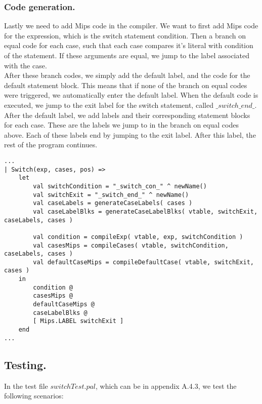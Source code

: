 \documentclass[12pt]{article}
\begin{document}
\pagebreak

\subsubsection{Code generation.}

\noindent Lastly we need to add Mips code in the compiler. We want to first add Mips code for the expression, which is the switch statement condition. Then a branch on equal code for each case, such that each case compares it's literal with condition of the statement. If these arguments are equal, we jump to the label associated with the case.\\

After these branch codes, we simply add the default label, and the code for the default statement block. This means that if none of the branch on equal codes were triggered, we automatically enter the default label. When the default code is executed, we jump to the exit label for the switch statement, called $\_switch\_end\_$. \\

After the default label, we add labels and their corresponding statement blocks for each case. These are the labels we jump to in the branch on equal codes above. Each of these labels end by jumping to the exit label. After this label, the rest of the program continues.

\begin{lstlisting}[caption=Compiler code for generating the Mips instructions]
...
| Switch(exp, cases, pos) =>
    let 
        val switchCondition = "_switch_con_" ^ newName()
        val switchExit = "_switch_end_" ^ newName()
        val caseLabels = generateCaseLabels( cases )
        val caseLabelBlks = generateCaseLabelBlks( vtable, switchExit, caseLabels, cases )

        val condition = compileExp( vtable, exp, switchCondition )
        val casesMips = compileCases( vtable, switchCondition, caseLabels, cases )
        val defaultCaseMips = compileDefaultCase( vtable, switchExit, cases ) 
    in
        condition @
        casesMips @
        defaultCaseMips @
        caseLabelBlks @
        [ Mips.LABEL switchExit ]
    end
...
\end{lstlisting}

\subsection{Testing.}

In the test file $switchTest.pal$, which can be in appendix A.4.3, we test the following scenarios:
\end{document}
